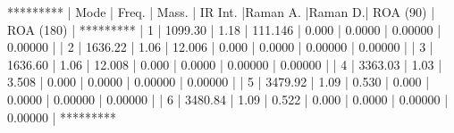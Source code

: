 \documentclass[letterpaper,10pt,english,openany,oneside]{sphinxmanual}
\begin{document}
\begin{sphinxVerbatim}[commandchars=\\\{\}]
 *\PYGZhy{}\PYGZhy{}\PYGZhy{}\PYGZhy{}\PYGZhy{}\PYGZhy{}*\PYGZhy{}\PYGZhy{}\PYGZhy{}\PYGZhy{}\PYGZhy{}\PYGZhy{}\PYGZhy{}\PYGZhy{}\PYGZhy{}*\PYGZhy{}\PYGZhy{}\PYGZhy{}\PYGZhy{}\PYGZhy{}\PYGZhy{}\PYGZhy{}\PYGZhy{}*\PYGZhy{}\PYGZhy{}\PYGZhy{}\PYGZhy{}\PYGZhy{}\PYGZhy{}\PYGZhy{}\PYGZhy{}\PYGZhy{}*\PYGZhy{}\PYGZhy{}\PYGZhy{}\PYGZhy{}\PYGZhy{}\PYGZhy{}\PYGZhy{}\PYGZhy{}\PYGZhy{}*\PYGZhy{}\PYGZhy{}\PYGZhy{}\PYGZhy{}\PYGZhy{}\PYGZhy{}\PYGZhy{}\PYGZhy{}*\PYGZhy{}\PYGZhy{}\PYGZhy{}\PYGZhy{}\PYGZhy{}\PYGZhy{}\PYGZhy{}\PYGZhy{}\PYGZhy{}\PYGZhy{}\PYGZhy{}*\PYGZhy{}\PYGZhy{}\PYGZhy{}\PYGZhy{}\PYGZhy{}\PYGZhy{}\PYGZhy{}\PYGZhy{}\PYGZhy{}\PYGZhy{}\PYGZhy{}*
 | Mode | Freq.   | Mass.  | IR Int. |Raman A. |Raman D.| ROA (90)  | ROA (180) |
 *\PYGZhy{}\PYGZhy{}\PYGZhy{}\PYGZhy{}\PYGZhy{}\PYGZhy{}*\PYGZhy{}\PYGZhy{}\PYGZhy{}\PYGZhy{}\PYGZhy{}\PYGZhy{}\PYGZhy{}\PYGZhy{}\PYGZhy{}*\PYGZhy{}\PYGZhy{}\PYGZhy{}\PYGZhy{}\PYGZhy{}\PYGZhy{}\PYGZhy{}\PYGZhy{}*\PYGZhy{}\PYGZhy{}\PYGZhy{}\PYGZhy{}\PYGZhy{}\PYGZhy{}\PYGZhy{}\PYGZhy{}\PYGZhy{}*\PYGZhy{}\PYGZhy{}\PYGZhy{}\PYGZhy{}\PYGZhy{}\PYGZhy{}\PYGZhy{}\PYGZhy{}\PYGZhy{}*\PYGZhy{}\PYGZhy{}\PYGZhy{}\PYGZhy{}\PYGZhy{}\PYGZhy{}\PYGZhy{}\PYGZhy{}*\PYGZhy{}\PYGZhy{}\PYGZhy{}\PYGZhy{}\PYGZhy{}\PYGZhy{}\PYGZhy{}\PYGZhy{}\PYGZhy{}\PYGZhy{}\PYGZhy{}*\PYGZhy{}\PYGZhy{}\PYGZhy{}\PYGZhy{}\PYGZhy{}\PYGZhy{}\PYGZhy{}\PYGZhy{}\PYGZhy{}\PYGZhy{}\PYGZhy{}*
 |    1 | 1099.30 |   1.18 | 111.146 |   0.000 | 0.0000 |   0.00000 |   0.00000 |
 |    2 | 1636.22 |   1.06 |  12.006 |   0.000 | 0.0000 |   0.00000 |   0.00000 |
 |    3 | 1636.60 |   1.06 |  12.008 |   0.000 | 0.0000 |   0.00000 |   0.00000 |
 |    4 | 3363.03 |   1.03 |   3.508 |   0.000 | 0.0000 |   0.00000 |   0.00000 |
 |    5 | 3479.92 |   1.09 |   0.530 |   0.000 | 0.0000 |   0.00000 |   0.00000 |
 |    6 | 3480.84 |   1.09 |   0.522 |   0.000 | 0.0000 |   0.00000 |   0.00000 |
 *\PYGZhy{}\PYGZhy{}\PYGZhy{}\PYGZhy{}\PYGZhy{}\PYGZhy{}*\PYGZhy{}\PYGZhy{}\PYGZhy{}\PYGZhy{}\PYGZhy{}\PYGZhy{}\PYGZhy{}\PYGZhy{}\PYGZhy{}*\PYGZhy{}\PYGZhy{}\PYGZhy{}\PYGZhy{}\PYGZhy{}\PYGZhy{}\PYGZhy{}\PYGZhy{}*\PYGZhy{}\PYGZhy{}\PYGZhy{}\PYGZhy{}\PYGZhy{}\PYGZhy{}\PYGZhy{}\PYGZhy{}\PYGZhy{}*\PYGZhy{}\PYGZhy{}\PYGZhy{}\PYGZhy{}\PYGZhy{}\PYGZhy{}\PYGZhy{}\PYGZhy{}\PYGZhy{}*\PYGZhy{}\PYGZhy{}\PYGZhy{}\PYGZhy{}\PYGZhy{}\PYGZhy{}\PYGZhy{}\PYGZhy{}*\PYGZhy{}\PYGZhy{}\PYGZhy{}\PYGZhy{}\PYGZhy{}\PYGZhy{}\PYGZhy{}\PYGZhy{}\PYGZhy{}\PYGZhy{}\PYGZhy{}*\PYGZhy{}\PYGZhy{}\PYGZhy{}\PYGZhy{}\PYGZhy{}\PYGZhy{}\PYGZhy{}\PYGZhy{}\PYGZhy{}\PYGZhy{}\PYGZhy{}*
\end{sphinxVerbatim}
\end{document}
